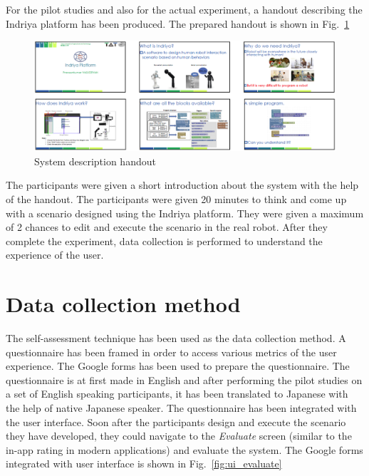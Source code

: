 For the pilot studies and also for the actual experiment, a handout describing the Indriya platform has been produced. The prepared handout is shown in Fig.~\ref{fig:handout}
\begin{figure}[H]
\centering
\includegraphics[width=\textwidth]{../thesis/assets/handout.png}
\caption[System description handout]{System description handout}
\label{fig:handout}
\end{figure}

The participants were given a short introduction about the system with the help of the handout. The participants were given 20 minutes to think and come up with a scenario designed using the Indriya platform. They were given a maximum of 2 chances to edit and execute the scenario in the real robot. After they complete the experiment, data collection is performed to understand the experience of the user. 

\section{Data collection method}
The self-assessment \cite{bethel2010review} technique has been used as the data collection method. A questionnaire has been framed in order to access various metrics of the user experience. The Google forms has been used to prepare the questionnaire. The questionnaire is at first made in English and after performing the pilot studies on a set of English speaking participants, it has been translated to Japanese with the help of native Japanese speaker. The questionnaire has been integrated with the user interface. Soon after the participants design and execute the scenario they have developed, they could navigate to the \emph{Evaluate} screen (similar to the in-app rating in modern applications) and evaluate the system. The Google forms integrated with user interface is shown in Fig.~\ref{fig:ui_evaluate}

